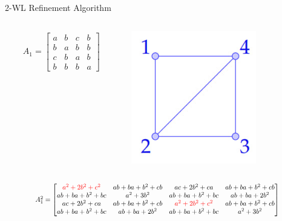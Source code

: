 \documentclass{beamer}
\begin{document}
\begin{frame}{2-WL Refinement Algorithm}
    \begin{columns}
        \begin{column}{0.7\textwidth}
        \begin{align*}
            A_1 = \begin{bmatrix}
                a&b&c&b\\
                b&a&b&b\\
                c&b&a&b\\
                b&b&b&a
            \end{bmatrix}
        \end{align*}
        \end{column}

        \begin{column}{0.3\textwidth}
            \centering
            \includegraphics[width=0.7\textwidth]{slides/pic_1.jpg}
        \end{column}
    \end{columns}
    
    \vspace{1em}
    \[
    \scalebox{0.8}{
    $
        A_1^2 = \begin{bmatrix}
            \textcolor{red}{a^2+2b^2+c^2} &ab+ba+b^2+cb&ac+2b^2+ca & ab+ba+b^2+cb\\
            ab+ba+b^2+bc&a^2+3b^2 & ab+ba+b^2+bc & ab+ba+2b^2\\
            ac+2b^2+ca&ab+ba+b^2+cb&\textcolor{red}{a^2+2b^2+c^2}&ab+ba+b^2+cb\\
            ab+ba+b^2+bc&ab+ba+2b^2&ab+ba+b^2+bc&a^2+3b^2
        \end{bmatrix}
    $
    }
    \]


\end{frame}
\end{document}
